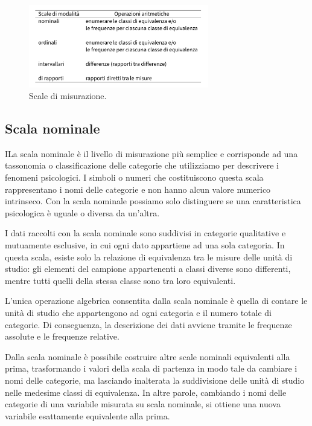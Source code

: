\documentclass[
  letterpaper,
  krantz2]{{[}./krantz{]}}
\begin{document}
\begin{figure}[H]

{\centering \includegraphics[width=0.7\textwidth,height=\textheight]{chapters/key_notions/../../figures/misurazione_2.png}

}

\caption{Scale di misurazione.}

\end{figure}%

\subsection{Scala nominale}\label{scala-nominale}

ILa scala nominale è il livello di misurazione più semplice e
corrisponde ad una tassonomia o classificazione delle categorie che
utilizziamo per descrivere i fenomeni psicologici. I simboli o numeri
che costituiscono questa scala rappresentano i nomi delle categorie e
non hanno alcun valore numerico intrinseco. Con la scala nominale
possiamo solo distinguere se una caratteristica psicologica è uguale o
diversa da un'altra.

I dati raccolti con la scala nominale sono suddivisi in categorie
qualitative e mutuamente esclusive, in cui ogni dato appartiene ad una
sola categoria. In questa scala, esiste solo la relazione di equivalenza
tra le misure delle unità di studio: gli elementi del campione
appartenenti a classi diverse sono differenti, mentre tutti quelli della
stessa classe sono tra loro equivalenti.

L'unica operazione algebrica consentita dalla scala nominale è quella di
contare le unità di studio che appartengono ad ogni categoria e il
numero totale di categorie. Di conseguenza, la descrizione dei dati
avviene tramite le frequenze assolute e le frequenze relative.

Dalla scala nominale è possibile costruire altre scale nominali
equivalenti alla prima, trasformando i valori della scala di partenza in
modo tale da cambiare i nomi delle categorie, ma lasciando inalterata la
suddivisione delle unità di studio nelle medesime classi di equivalenza.
In altre parole, cambiando i nomi delle categorie di una variabile
misurata su scala nominale, si ottiene una nuova variabile esattamente
equivalente alla prima.
\end{document}

